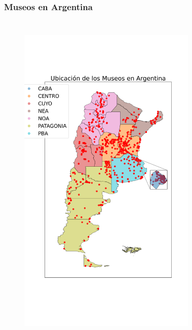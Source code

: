 \documentclass{beamer}
\begin{document}
\begin{frame}
\frametitle{Museos en Argentina}
\vspace{-5em}
\begin{columns}
\begin{figure}
\includegraphics[height=1.1\textheight]{museos_datosabiertos.png}
\label{fig:museos}
\end{figure}
\begin{figure}

\end{figure}
\end{columns}
\end{frame}
\end{document}
